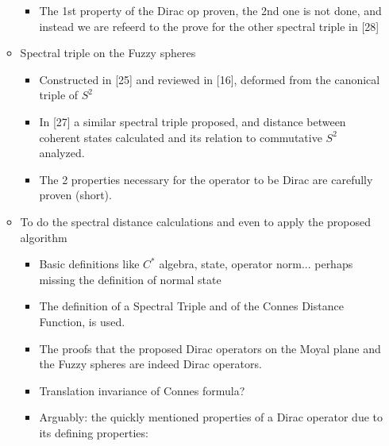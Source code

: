 \documentclass{article}
\begin{document}
\begin{itemize}
\begin{itemize}
\begin{itemize}
            \item The 1st property of the Dirac op proven, the 2nd one is not done, and instead we are refeerd to the prove for the other spectral triple in [28]
                
            \end{itemize}
            
        \item Spectral triple on the Fuzzy spheres
        
            \begin{itemize}
                
            \item Constructed in [25] and reviewed in [16], deformed from the canonical triple of $S^2$
            
            \item In [27] a similar spectral triple proposed, and distance between coherent states calculated and its relation to commutative $S^2$ analyzed.
            
            \item The 2 properties necessary for the operator to be Dirac are carefully proven (short).
            
            \end{itemize}
        
        \item To do the spectral distance calculations and even to apply the proposed algorithm
        
            \begin{itemize}
            
            \item Basic definitions like $C^*$ algebra, state, operator norm... perhaps missing the definition of normal state
            
            \item The definition of a Spectral Triple and of the Connes Distance Function, is used.
            
            \item The proofs that the proposed Dirac operators on the Moyal plane and the Fuzzy spheres are indeed Dirac operators.
            
            \item Translation invariance of Connes formula?
            
            \item Arguably: the quickly mentioned properties of a Dirac operator due to its defining properties: 
            

\end{itemize}
\end{itemize}
\end{itemize}
\end{document}
